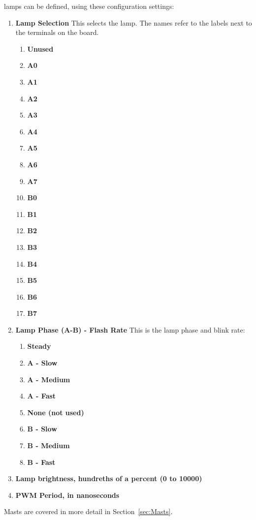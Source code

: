 \begin{enumerate}
\begin{enumerate}
lamps can be defined, using these configuration settings:
\begin{enumerate}
\item \textbf{Lamp Selection} This selects the lamp.  The names refer to the 
labels next to the terminals on the board.
\begin{enumerate}
\item \textbf{Unused}
\item \textbf{A0}
\item \textbf{A1}
\item \textbf{A2}
\item \textbf{A3}
\item \textbf{A4}
\item \textbf{A5}
\item \textbf{A6}
\item \textbf{A7}
\item \textbf{B0}
\item \textbf{B1}
\item \textbf{B2}
\item \textbf{B3}
\item \textbf{B4}
\item \textbf{B5}
\item \textbf{B6}
\item \textbf{B7}
\end{enumerate}
\item \textbf{Lamp Phase (A-B) - Flash Rate} This is the lamp phase and blink 
rate:
\begin{enumerate}
\item \textbf{Steady}
\item \textbf{A - Slow}
\item \textbf{A - Medium}
\item \textbf{A - Fast}
\item \textbf{None (not used)}
\item \textbf{B - Slow}
\item \textbf{B - Medium}
\item \textbf{B - Fast}
\end{enumerate}
\item \textbf{Lamp brightness, hundreths of a percent (0 to 10000)}
\item \textbf{PWM Period, in nanoseconds}
\end{enumerate}
\end{enumerate}
\end{enumerate}

Masts are covered in more detail in Section~\ref{sec:Masts}.

